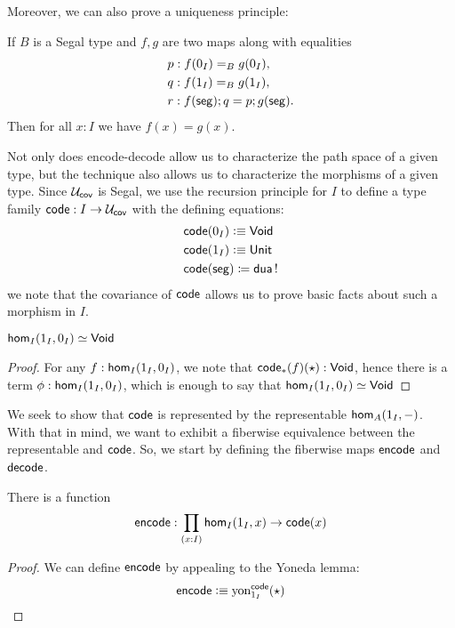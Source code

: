 \documentclass[main.tex]{subfiles}
\begin{document}
Moreover, we can also prove a uniqueness principle:
\begin{lemma}
 If $B$ is a Segal type and $f,g$ are two maps along with equalities
 \begin{align*}
    &p : f(0_I) =_B g(0_I),\\ 
    &q : f(1_I) =_B g(1_I),\\
    &r : f(\seg);q = p;g(\seg).
 \end{align*}
 Then for all $x : I$ we have $f(x) = g(x)$.
\end{lemma}


Not only does encode-decode allow us to characterize the path space of a given type, but the technique also allows us to characterize the morphisms of a given type. Since $\uc$ is Segal, we use the recursion principle for $I$ to define a type family $\co : I \to \uc$ with the defining equations:
\begin{align*}
    &\co (0_I) \defeq \vo\\
    &\co (1_I) \defeq \Un\\
    &\co (\seg) \coloneqq \dua\, !
\end{align*}
we note that the covariance of $\co$ allows us to prove basic facts about such a morphism in $I$.
\begin{lemma}
    $\ho[I]{1_I}{0_I} \simeq \vo$
\end{lemma}
\begin{proof}
    For any $f : \ho[I]{1_I}{0_I} $, we note that $\co_*(f)(\star) : \vo$, hence there is a term $\phi :\ho[I]{1_I}{0_I}$, which is enough to say that $\ho[I]{1_I}{0_I} \simeq \vo$
\end{proof}

We seek to show that $\co$ is represented by the representable $\ho[A]{1_I}{-}$. With that in mind, we want to exhibit a fiberwise equivalence between the representable and $\co$. So, we start by defining the fiberwise maps $\eco$ and $\dco$.

\begin{lemma}
    There is a function $$\eco: \prod_{(x:I)} \ho[I]{1_I}{x} \to \co(x)$$ 
\end{lemma}
\begin{proof}
    We can define $\eco$ by appealing to the Yoneda lemma:
    \begin{align*}
    \eco \defeq \text{yon}_{1_I}^{\co}(\star)
\end{align*}
\end{proof}
\end{document}
